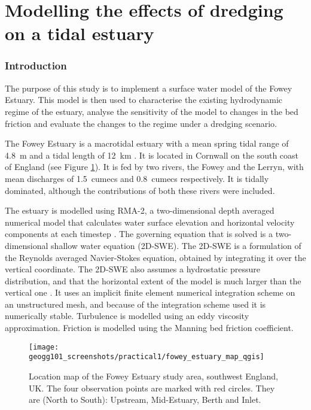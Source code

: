 \documentclass{article}
\begin{document}
\part*{Modelling the effects of dredging on a tidal estuary}

\section{Introduction}

The purpose of this study is to implement a surface water model of the Fowey Estuary. This model is then used to characterise the existing hydrodynamic regime of the estuary, analyse the sensitivity of the model to changes in the bed friction and evaluate the changes to the regime under a dredging scenario. %

The Fowey Estuary is a macrotidal estuary with a mean spring tidal range of \SI{4.8}{\m} and a tidal length of \SI{12}{km} \parencite{uncles2002dependence}. It is located in Cornwall on the south coast of England (see Figure \ref{fig:fowey_estuary_map}). It is fed by two rivers, the Fowey and the Lerryn, with mean discharges of \SI{1.5}{cumecs} and \SI{0.8}{cumecs} respectively. It is tidally dominated, although the contributions of both these rivers were included.

The estuary is modelled using RMA-2, a two-dimensional depth averaged numerical model that calculates water surface elevation and horizontal velocity components at each timestep \parencite{king1990program}.
The governing equation that is solved is a two-dimensional shallow water equation (2D-SWE). The 2D-SWE is a formulation of the Reynolds averaged Navier-Stokes equation, obtained by integrating it over the vertical coordinate. The 2D-SWE also assumes a hydrostatic pressure distribution, and that the horizontal extent of the model is much larger than the vertical one \parencite{cea2006numerical}.
It uses an implicit finite element numerical integration scheme on an unstructured mesh, and because of the integration scheme used it is numerically stable. Turbulence is modelled using an eddy viscosity approximation. Friction is modelled using the Manning bed friction coefficient.

\begin{figure}[hbp]
    \centering
    \texttt{[image: geogg101\_screenshots/practical1/fowey\_estuary\_map\_qgis]}
    \caption{Location map of the Fowey Estuary study area, southwest England, UK. The four observation points are marked with red circles. They are (North to South): Upstream, Mid-Estuary, Berth and Inlet. }
    \label{fig:fowey_estuary_map}
\end{figure}
\end{document}
